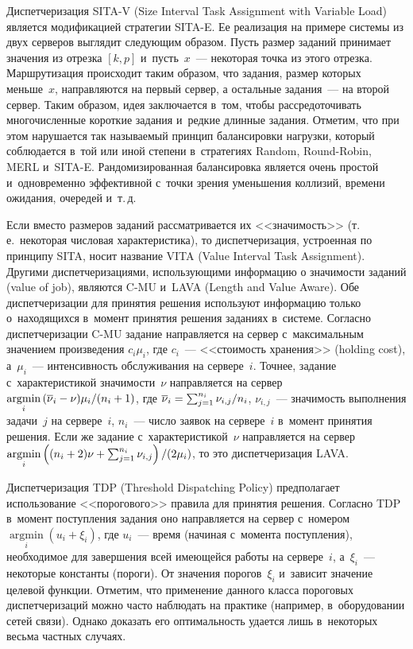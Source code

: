 \begin{multicols}{2}
    Диспетчеризация SITA-V (Size Interval Task Assignment with Variable Load) является 
модификацией стратегии SITA-E. Ее реализация на примере системы из двух серверов 
выглядит следующим образом. Пусть размер заданий принимает значения из отрезка 
$[k,p]$ и~пусть~$x$~--- некоторая точка из этого отрезка. Маршрутизация происходит 
таким образом, что задания, размер которых меньше~$x$, на\-прав\-ля\-ют\-ся на первый 
сервер, а остальные задания~--- на второй сервер. Таким образом, идея заключается в~том, 
чтобы рассредоточивать многочисленные короткие задания и~редкие длинные задания. 
Отметим, что при этом нарушается так называемый принцип балансировки нагрузки, 
который соблюдается в~той или иной степени в~стратегиях Random, Round-Robin, MERL 
и~SITA-E. Рандомизированная балансировка является очень простой и~одновременно 
эффективной с~точки зрения уменьшения коллизий, времени ожидания, очередей и~т.\,д.
    
    Если вместо размеров заданий рассматривается их <<значимость>> (т.\,е.\ некоторая 
числовая характеристика), то диспетчеризация, устроенная по принципу SITA, носит 
название VITA (Value Interval Task Assignment). Другими диспетчеризациями, 
использующими информацию о значимости заданий (value of job), являются C-MU 
и~LAVA  (Length and Value Aware). Обе диспетчеризации для принятия решения используют информацию только 
о~находящихся в~момент принятия решения заданиях в~сис\-те\-ме. Согласно 
диспетчеризации C-MU задание направляется на сервер с~максимальным значением 
произведения $c_i\mu_i$, где $c_i$~--- <<стоимость хранения>> (holding cost), 
а~$\mu_i$~--- интенсивность обслуживания на сервере~$i$. Точнее, задание 
с~характеристикой значимости~$\nu$ направляется на сервер 
$\mathop{\mathrm{argmin}}\limits_i\,(\overline{\nu}_i\hm-\nu)\mu_i/(n_i+1)$, где 
$\overline{\nu}_i\hm= \sum_{j=1}^{n_i} \nu_{i,j}/n_i$, $\nu_{i,j}$~--- значимость 
выполнения задачи~$j$ на сервере~$i$, $n_i$~--- число заявок на сервере~$i$ в~момент 
принятия решения. Если же задание с~характеристикой~$\nu$ направляется на сервер 
$\mathop{\mathrm{argmin}}\limits_i \left((n_i\hm+2)\nu\hm+\sum_{j=1}^{n_i}
\nu_{i,j}\right)/(2\mu_i)$, то это диспетчеризация LAVA.
    
    Диспетчеризация TDP (Threshold Dispatching Policy) предполагает использование 
<<порогового>> правила для принятия решения. Согласно TDP в~момент поступления 
задания оно направляется на сервер с~номером 
$\mathop{\mathrm{argmin}}\limits_i(u_i+\xi_i)$, где $u_i$~--- время (начиная с~момента 
поступления), необходимое для завершения всей имеющейся работы на сервере~$i$, 
а~$\xi_i$~--- некоторые константы (пороги). От значения порогов~$\xi_i$ и~зависит 
значение целевой функции. Отметим, что применение данного класса пороговых 
диспетчеризаций можно часто наблюдать на практике (например, в~оборудовании сетей 
связи). Однако доказать его оптимальность удается лишь в~некоторых весьма частных 
случаях.
    

\end{multicols}
